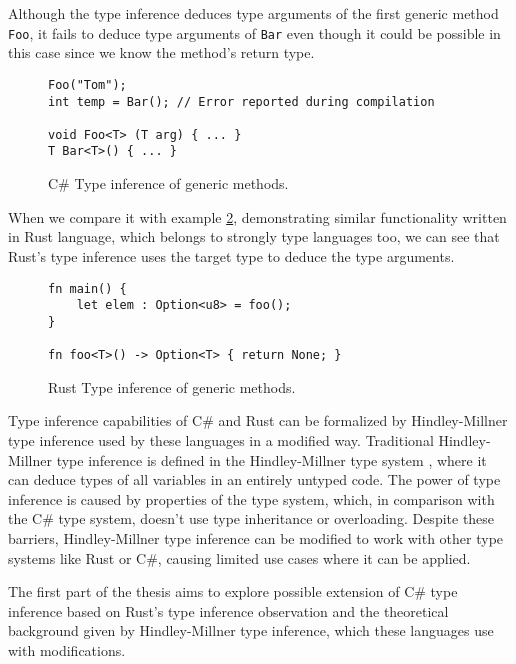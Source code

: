 Although the type inference deduces type arguments of the first generic method \texttt{Foo}, it fails to deduce type arguments of \texttt{Bar} even though it could be possible in this case since we know the method's return type.
\par
\begin{figure}
\begin{lstlisting}[style=csharp]
Foo("Tom");
int temp = Bar(); // Error reported during compilation

void Foo<T> (T arg) { ... }
T Bar<T>() { ... }
\end{lstlisting}
\caption{C\# Type inference of generic methods.}
\label{img02:csharp_infer_meth}
\end{figure}
\par
When we compare it with example \ref{img03:rust_infer_meth}, demonstrating similar functionality written in Rust language, which belongs to strongly type languages too, we can see that Rust's type inference uses the target type to deduce the type arguments.
\par
\begin{figure}
\begin{lstlisting}[style=csharp]
fn main() {
    let elem : Option<u8> = foo(); 
}

fn foo<T>() -> Option<T> { return None; }
\end{lstlisting}
\caption{Rust Type inference of generic methods.}
\label{img03:rust_infer_meth}
\end{figure}
\par
{}
Type inference capabilities of C\# and Rust can be formalized by Hindley-Millner type inference \cite{online:yHM} used by these languages in a modified way. 
Traditional Hindley-Millner type inference is defined in the Hindley-Millner type system \cite{online:wikiHM}, where it can deduce types of all variables in an entirely untyped code. 
The power of type inference is caused by properties of the type system, which, in comparison with the C\# type system, doesn't use type inheritance or overloading. 
Despite these barriers, Hindley-Millner type inference can be modified to work with other type systems like Rust or C\#, causing limited use cases where it can be applied.
\par
{}
The first part of the thesis aims to explore possible extension of C\# type inference based on Rust's type inference observation and the theoretical background given by Hindley-Millner type inference, which these languages use with modifications.

